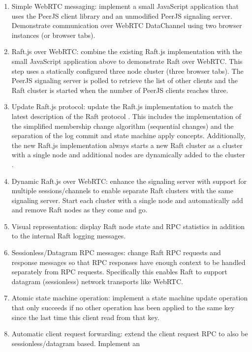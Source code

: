 \documentclass[conference,compsoc]{./IEEEtran/IEEEtran}
\begin{document}
\begin{enumerate}
\item Simple WebRTC messaging: implement a small JavaScript
    application that uses the PeerJS client library and an unmodified
    PeerJS signaling server. Demonstrate communication over WebRTC
    DataChannel using two browser instances (or browser tabs).
\item Raft.js over WebRTC: combine the existing Raft.js implementation
    with the small JavaScript application above to demonstrate Raft
    over WebRTC. This step uses a statically configured three node
    cluster (three browser tabs). The PeerJS signaling server is
    polled to retrieve the list of other clients and the Raft cluster
    is started when the number of PeerJS clients reaches three.
\item Update Raft.js protocol: update the Raft.js implementation to
    match the latest description of the Raft protocol
    \cite{raft_thesis:ongaro14}. This includes the implementation of
    the simplified membership change algorithm (sequential changes)
    and the separation of the log commit and state machine apply
    concepts.  Additionally, the new Raft.js implementation always
    starts a new Raft cluster as a cluster with a single node and
    additional nodes are dynamically added to the cluster
    \cite[Section~4.4]{raft_thesis:ongaro14}.
\item Dynamic Raft.js over WebRTC: enhance the signaling server with
    support for multiple sessions/channels to enable separate Raft
    clusters with the same signaling server. Start each cluster with
    a single node and automatically add and remove Raft nodes as they
    come and go.
\item Visual representation: display Raft node state and RPC
    statistics in addition to the internal Raft logging messages.
\item Sessionless/Datagram RPC messages: change Raft RPC requests and
    response messages so that RPC responses have enough context to be
    handled separately from RPC requests. Specifically this enables
    Raft to support datagram (sessionless) network transports like
    WebRTC.
\item Atomic state machine operation: implement a state machine
    update operation that only succeeds if no other operation has been
    applied to the same key since the last time this client read from
    that key.
\item Automatic client request forwarding: extend the client request
    RPC to also be sessionless/datagram based. Implement an

\end{enumerate}
\end{document}
